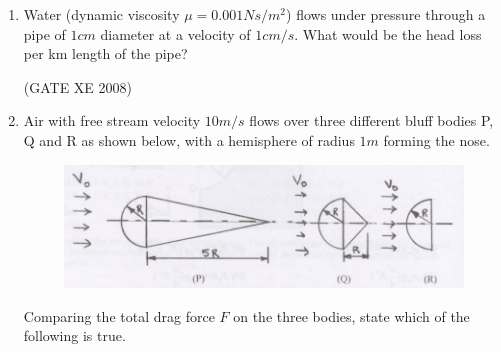 \documentclass[12pt]{article}
\begin{document}
\begin{enumerate}
\begin{enumerate}
\end{enumerate}

(GATE XE 2008)
\item Water (dynamic viscosity $\mu = 0.001 Ns/m^2$) flows under pressure through a pipe of $1 cm$ diameter at a velocity of $1 cm/s$. What would be the head loss per km length of the pipe?

\begin{enumerate}
\end{enumerate}

(GATE XE 2008)
\item  Air with free stream velocity $10 m/s$ flows over three different bluff bodies P, Q and R as shown below, with a hemisphere of radius $1 m$ forming the nose.

\begin{figure}[H]
\centering
  \includegraphics[width=0.7\columnwidth]{figs/ass1_d_q21.png}
  \caption{}
\end{figure} 

Comparing the total drag force $F$ on the three bodies, state which of the following is true.

\begin{enumerate}
\end{enumerate}


\end{enumerate}
\end{document}
